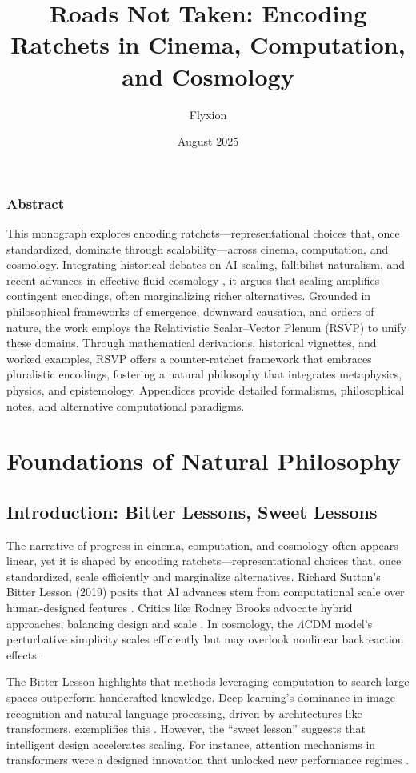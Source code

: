 \documentclass[12pt]{book}
\title{Roads Not Taken: Encoding Ratchets in Cinema, Computation, and Cosmology}
\author{Flyxion}
\date{August 2025}
\makeatletter
\newenvironment{abstract}{%
  \if@twocolumn
    \section*{Abstract}
  \else
    \begin{center}
      {\bfseries\abstractname\vspace{-.5em}\vspace{\z@}}
    \end{center}
    \quotation
  \fi}
  {\if@twocolumn\else\endquotation\fi}
\newcommand{\textLambda}{\ensuremath{\Lambda}}
\makeatother
\begin{document}
\frontmatter
\maketitle

\begin{abstract}
This monograph explores encoding ratchets—representational choices that, once standardized, dominate through scalability—across cinema, computation, and cosmology. Integrating historical debates on AI scaling, fallibilist naturalism, and recent advances in effective-fluid cosmology \citep{Giani2025}, it argues that scaling amplifies contingent encodings, often marginalizing richer alternatives. Grounded in philosophical frameworks of emergence, downward causation, and orders of nature, the work employs the Relativistic Scalar–Vector Plenum (RSVP) to unify these domains. Through mathematical derivations, historical vignettes, and worked examples, RSVP offers a counter-ratchet framework that embraces pluralistic encodings, fostering a natural philosophy that integrates metaphysics, physics, and epistemology. Appendices provide detailed formalisms, philosophical notes, and alternative computational paradigms.
\end{abstract}

\tableofcontents

\mainmatter
\part{Foundations of Natural Philosophy}

\chapter{Introduction: Bitter Lessons, Sweet Lessons}
The narrative of progress in cinema, computation, and cosmology often appears linear, yet it is shaped by encoding ratchets—representational choices that, once standardized, scale efficiently and marginalize alternatives. Richard Sutton’s Bitter Lesson (2019) posits that AI advances stem from computational scale over human-designed features \citep{Sutton2019}. Critics like Rodney Brooks advocate hybrid approaches, balancing design and scale \citep{Brooks2019}. In cosmology, the \textLambda CDM model’s perturbative simplicity scales efficiently but may overlook nonlinear backreaction effects \citep{Buchert2000, Giani2025}.

The Bitter Lesson highlights that methods leveraging computation to search large spaces outperform handcrafted knowledge. Deep learning’s dominance in image recognition and natural language processing, driven by architectures like transformers, exemplifies this \citep{LeCun2015, Vaswani2017}. However, the “sweet lesson” suggests that intelligent design accelerates scaling. For instance, attention mechanisms in transformers were a designed innovation that unlocked new performance regimes \citep{Vaswani2017}.
\end{document}
